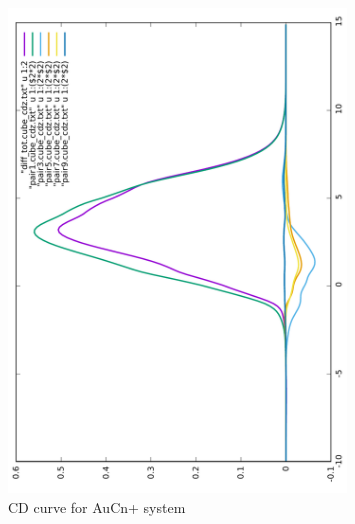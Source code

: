 \documentclass[journal=inoraj,manuscript=article]{achemso}
\begin{document}
\begin{figure}[!h]
\includegraphics[angle=-90,width=0.80\textwidth]{./AuCn+/cd.pdf}
\caption{CD curve for AuCn+ system}
\end{figure}
\end{document}
